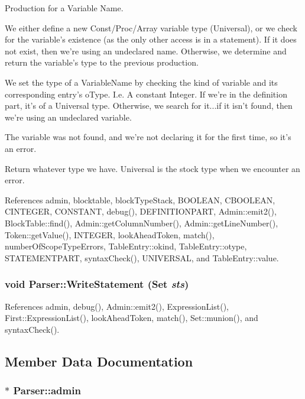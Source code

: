 Production for a Variable Name. 

We either define a new Const/Proc/Array variable type (Universal), or we check for the variable's existence (as the only other access is in a statement). If it does not exist, then we're using an undeclared name. Otherwise, we determine and return the variable's type to the previous production. 

We set the type of a VariableName by checking the kind of variable and its corresponding entry's oType. I.e. A constant Integer. If we're in the definition part, it's of a Universal type. Otherwise, we search for it...if it isn't found, then we're using an undeclared variable.

The variable was not found, and we're not declaring it for the first time, so it's an error.

Return whatever type we have. Universal is the stock type when we encounter an error. 



References admin, blocktable, blockTypeStack, BOOLEAN, CBOOLEAN, CINTEGER, CONSTANT, debug(), DEFINITIONPART, Admin::emit2(), BlockTable::find(), Admin::getColumnNumber(), Admin::getLineNumber(), Token::getValue(), INTEGER, lookAheadToken, match(), numberOfScopeTypeErrors, TableEntry::okind, TableEntry::otype, STATEMENTPART, syntaxCheck(), UNIVERSAL, and TableEntry::value.

\hypertarget{classParser_a092a51a38e65c3be07328bfc1e370f0e}{
\subsubsection[{WriteStatement}]{\setlength{\rightskip}{0pt plus 5cm}void Parser::WriteStatement ({\bf Set} {\em sts})}}
\label{classParser_a092a51a38e65c3be07328bfc1e370f0e}


References admin, debug(), Admin::emit2(), ExpressionList(), First::ExpressionList(), lookAheadToken, match(), Set::munion(), and syntaxCheck().



\subsection{Member Data Documentation}
\hypertarget{classParser_a96a8ee1229f37648e0ee704827b1c4c7}{
\subsubsection[{admin}]{$\ast$ {\bf Parser::admin}}}
\label{classParser_a96a8ee1229f37648e0ee704827b1c4c7}


